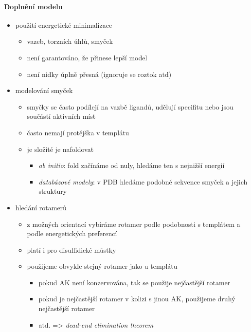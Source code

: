 \documentclass[DIV=8]{scrreprt}
\begin{document}
\paragraph{Doplnění modelu}
\begin{itemize}[nosep]
    \item použití energetické minimalizace
\begin{itemize}[nosep]
    \item vazeb, torzních úhlů, smyček
    \item není garantováno, že přinese lepší model
    \item není nidky úplně přesná (ignoruje se roztok atd)
\end{itemize}

    \item modelování smyček
\begin{itemize}[nosep]
    \item smyčky se často podílejí na vazbě ligandů, udělují specifitu nebo jsou součástí aktivních míst
    \item často nemají protějška v templátu
    \item je složité je nafoldovat
\begin{itemize}[nosep]
    \item \emph{ab initio}: fold začínáme od nuly, hledáme ten s nejnižší energií
    \item \emph{databázové modely}: v PDB hledáme podobné sekvence smyček a jejich struktury
\end{itemize}

\end{itemize}

    \item hledání rotamerů
\begin{itemize}[nosep]
    \item z možných orientací vybíráme rotamer podle podobnosti s templátem a podle energetických preferencí
    \item platí i pro disulfidické můstky
    \item použijeme obvykle stejný rotamer jako u templátu
\begin{itemize}[nosep]
    \item pokud AK není konzervována, tak se použije nejčastější rotamer
    \item pokud je nejčastější rotamer v kolizi s jinou AK, použijeme druhý nejčastější rotamer
    \item atd. => \emph{dead-end elimination theorem}
\end{itemize}

\end{itemize}

\end{itemize}
\end{document}
